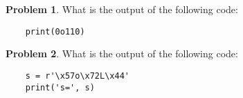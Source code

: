 \documentclass[10pt]{article}
\theoremstyle{definition}
\newtheorem{problem}{Problem}
\newcommand{\x}{\mathbf x}
\begin{document}
\newpage
\begin{problem}
    What is the output of the following code:
\end{problem}
\begin{lstlisting}
    print(0o110)
\end{lstlisting}
\vspace{1.5in}


\begin{problem}
    What is the output of the following code:
\end{problem}
\begin{lstlisting}
    s = r'\x57o\x72L\x44'
    print('s=', s)
\end{lstlisting}
\vspace{1.5in}
\end{document}
